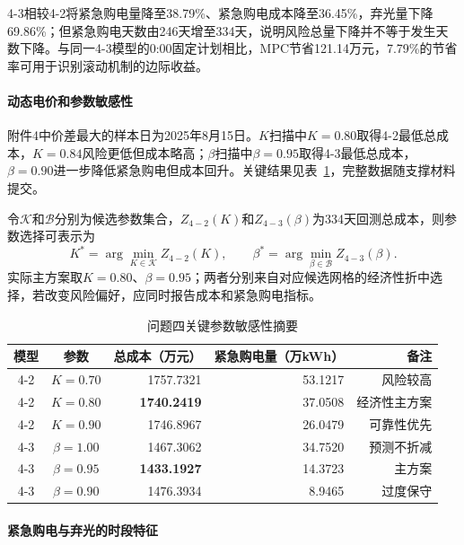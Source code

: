 \documentclass{cumcmthesis}
\begin{document}
4-3相较4-2将紧急购电量降至38.79\%、紧急购电成本降至36.45\%，弃光量下降69.86\%；但紧急购电天数由246天增至334天，说明风险总量下降并不等于发生天数下降。与同一4-3模型的0:00固定计划相比，MPC节省121.14万元，7.79\%的节省率可用于识别滚动机制的边际收益。

\paragraph{动态电价和参数敏感性}

附件4中价差最大的样本日为2025年8月15日。$K$扫描中$K=0.80$取得4-2最低总成本，$K=0.84$风险更低但成本略高；$\beta$扫描中$\beta=0.95$取得4-3最低总成本，$\beta=0.90$进一步降低紧急购电但成本回升。关键结果见表~\ref{tab:q4sens}，完整数据随支撑材料提交。

令$\mathcal K$和$\mathcal B$分别为候选参数集合，$Z_{4-2}(K)$和$Z_{4-3}(\beta)$为334天回测总成本，则参数选择可表示为
\begin{equation}
K^*=\arg\min_{K\in\mathcal K}Z_{4-2}(K),\qquad
\beta^*=\arg\min_{\beta\in\mathcal B}Z_{4-3}(\beta).
\tag{27a}
\end{equation}
实际主方案取$K=0.80$、$\beta=0.95$；两者分别来自对应候选网格的经济性折中选择，若改变风险偏好，应同时报告成本和紧急购电指标。

\begin{table}[H]
\centering
\renewcommand\arraystretch{1.2}
\caption{问题四关键参数敏感性摘要}
\label{tab:q4sens}
\begin{tabular}{ccrrr}
\toprule
\textbf{模型} & \textbf{参数} & 总成本（万元） & 紧急购电量（万kWh） & 备注\\
\midrule
4-2 & $K=0.70$ & 1757.7321 & 53.1217 & 风险较高\\
4-2 & $K=0.80$ & \textbf{1740.2419} & 37.0508 & 经济性主方案\\
4-2 & $K=0.90$ & 1746.8967 & 26.0479 & 可靠性优先\\
4-3 & $\beta=1.00$ & 1467.3062 & 34.7520 & 预测不折减\\
4-3 & $\beta=0.95$ & \textbf{1433.1927} & 14.3723 & 主方案\\
4-3 & $\beta=0.90$ & 1476.3934 & 8.9465 & 过度保守\\
\bottomrule
\end{tabular}
\end{table}

\paragraph{紧急购电与弃光的时段特征}
\end{document}
